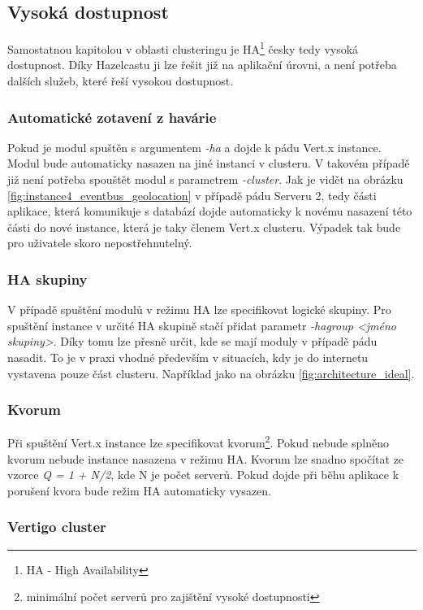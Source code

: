\subsection{Vysoká dostupnost}

Samostatnou kapitolou v oblasti clusteringu je HA\footnote{HA - High Availability} česky tedy vysoká dostupnost. Díky Hazelcastu ji lze řešit již na aplikační úrovni, a není potřeba  dalších služeb, které řeší vysokou dostupnost.

\subsubsection{Automatické zotavení z havárie}

Pokud je modul spuštěn s argumentem \emph{-ha} a dojde k pádu Vert.x instance. Modul bude automaticky nasazen na jiné instanci v clusteru. V takovém případě již není potřeba spouštět modul s parametrem \emph{-cluster}. Jak je vidět na obrázku \ref{fig:instance4_eventbus_geolocation} v případě pádu Serveru 2, tedy části aplikace, která komunikuje s databází dojde automaticky k novému nasazení této části do nové instance, která je taky členem Vert.x clusteru. Výpadek tak bude pro uživatele skoro nepostřehnutelný.

\subsubsection{HA skupiny}

V případě spuštění modulů v režimu HA lze specifikovat logické skupiny. Pro spuštění instance v určité HA skupině stačí přidat parametr \emph{-hagroup <jméno skupiny>}. Díky tomu lze přesně určit, kde se mají moduly v případě pádu nasadit. To je v praxi vhodné především v situacích, kdy je do internetu vystavena pouze část clusteru. Například jako na obrázku \ref{fig:architecture_ideal}.

\subsubsection{Kvorum}

Při spuštění Vert.x instance lze specifikovat kvorum\footnote{minimální počet serverů pro zajištění vysoké dostupnosti}. Pokud nebude splněno kvorum nebude instance nasazena v režimu HA. Kvorum lze snadno spočítat ze vzorce \emph{Q = 1 + N/2}, kde N je počet serverů. Pokud dojde při běhu aplikace k porušení kvora bude režim HA automaticky vysazen.

\subsubsection{Vertigo cluster}

